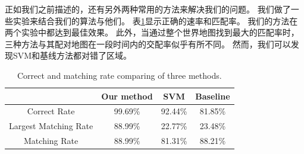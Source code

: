 正如我们之前描述的，还有另外两种常用的方法来解决我们的问题。 我们做了一些实验来结合我们的算法与他们。 表\ref{tab:methods}显示正确的速率和匹配率。 我们的方法在两个实验中都达到最佳效果。 此外，当通过整个世界地图找到最大的匹配率时，三种方法与其配对地图在一段时间内的交配率似乎有所不同。 然而，我们可以发现SVM和基线方法都对错了区域。
\begin{table}[!t]
	\renewcommand{\arraystretch}{1.3}
	\caption{Correct and matching rate comparing of three methods.}
	\label{tab:methods}
	\centering
	\begin{tabular}{c|ccc}
		\hline
		& Our method & SVM & Baseline \\
		\hline
		Correct Rate & 99.69\% & 92.44\% & 81.85\% \\
		\hline
		Largest Matching Rate & 88.99\% & 22.77\% & 23.48\% \\
		\hline
		Matching Rate & 88.99\% & 81.31\% & 88.21\% \\
		\hline
	\end{tabular}
\end{table}

